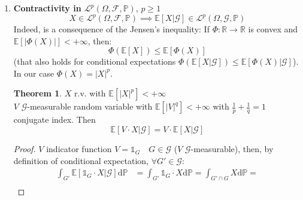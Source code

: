 \documentclass[10pt,a4paper]{article}
\theoremstyle{definition}
\newtheorem{teo}{Theorem}[section]
\newcommand{\ind}{\mathds{1}}
\newcommand{\fg}[3][\relax]{%
  \begin{figure}[H]%
    \centering
    \captionsetup{width=0.7\textwidth}
      \texttt{[image: \#3]}%
      \ifx\relax#1\else\caption{#1}\fi
      \label{#3}
  \end{figure}%
}
\begin{document}
\begin{enumerate}
\begin{proof}
\begin{figure}[htpb]
\begin{tikzpicture}
	\end{tikzpicture}
	\caption{Approximation of the identity map.}
\end{figure}
s.t.:
\begin{equation*}
	\int_{G}f_n (X)\mathrm{d}\mathbb{P}=\int_{G}\mathbb{E}[f_n (X)]\mathrm{d}\mathbb{P}
\end{equation*}
Finally, applying the monotone convergence theorem as $n\to\infty$
\begin{equation*}
	\int_{G}X\mathrm{d}\mathbb{P}=\int_{G}\mathbb{E}[X]\mathrm{d}\mathbb{P}
\end{equation*}
\end{proof}
\item \textbf{Contractivity in $\mathcal{L}^p(\Omega,\mathcal{F},\mathbb{P})$}, $p\geq 1$ \\
\begin{equation*}
	X \in \mathcal{L}^p(\Omega,\mathcal{F},\mathbb{P})\implies \mathbb{E}[X|\mathcal{G}]\in \mathcal{L}^p(\Omega,\mathcal{G},\mathbb{P})
\end{equation*}
Indeed, is a consequence of the Jensen's inequality:
If $\Phi : \mathbb{R}\to\mathbb{R}$ is convex and $\mathbb{E}[|\Phi(X)|]<+\infty $, then:
\begin{equation*}
\Phi(\mathbb{E}[X])\leq\mathbb{E}[\Phi(X)]
\end{equation*}
(that also holds for conditional expectations $\Phi(\mathbb{E}[X|\mathcal{G}])\leq\mathbb{E}[\Phi(X)|\mathcal{G}]$). In our case $ \Phi(X)=|X|^p$.
\begin{teo}
	$X$ r.v. with $\mathbb{E}[|X|^p]<+\infty $\\
	$V$ $\mathcal{G}$-measurable random variable with $\mathbb{E}[|V|^q]<+\infty$ with $\frac{1}{p}+\frac{1}{q}=1$ conjugate index.
	Then
	\begin{equation*}
		\mathbb{E}[V\cdot X|\mathcal{G}]=V\cdot \mathbb{E}[X|\mathcal{G}]
	\end{equation*}
\end{teo}
\begin{proof}
	$V$ indicator function $V=\ind_G \quad G\in\mathcal{G}$ ($V$ $\mathcal{G}$-measurable), then, by definition of conditional expectation, $\forall G'\in \mathcal{G}$:
\begin{equation*}
	\begin{split}
		\int_{G'}\mathbb{E}[\ind_G \cdot X|\mathcal{G}]\mathrm{d}\mathbb{P}&=
		\int_{G'}\ind_G \cdot X\mathrm{d}\mathbb{P}=
		\int_{G'\cap G}X\mathrm{d}\mathbb{P}=\\

\end{split}
\end{equation*}
\end{proof}
\end{enumerate}
\end{document}
